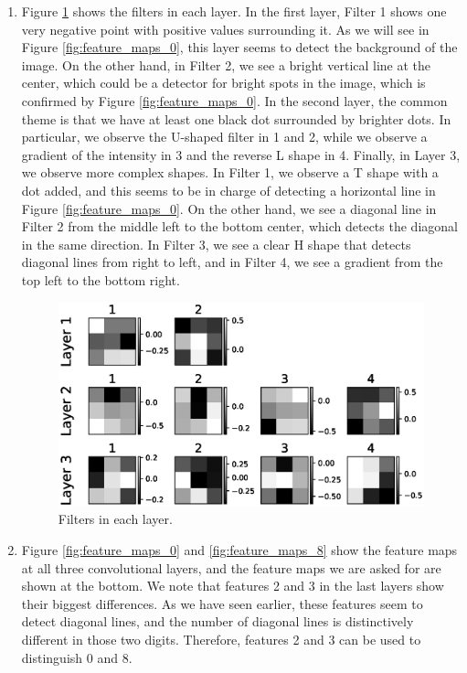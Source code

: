 \documentclass[
	12pt, %
]{../Template/fphw}
\begin{document}
\begin{enumerate}[label = (\arabic*)]
    \item Figure \ref{fig:filters} shows the filters in each layer. In the first layer, Filter 1 shows one very negative point with positive values surrounding it.   As we will see in Figure \ref{fig:feature_maps_0}, this layer seems to detect the background of the image. On the other hand, in Filter 2, we see a bright vertical line at the center, which could be a detector for bright spots in the image, which is confirmed by Figure \ref{fig:feature_maps_0}. In the second layer, the common theme is that we have at least one black dot surrounded by brighter dots. In particular, we observe the U-shaped filter in 1 and 2, while we observe a gradient of the intensity in 3 and the reverse L shape in 4. Finally, in Layer 3, we observe more complex shapes. In Filter 1, we observe a T shape with a dot added, and this seems to be in charge of detecting a horizontal line in Figure \ref{fig:feature_maps_0}. On the other hand, we see a diagonal line in Filter 2 from the middle left to the bottom center, which detects the diagonal in the same direction. In Filter 3, we see a clear H shape that detects diagonal lines from right to left, and in Filter 4, we see a gradient from the top left to the bottom right.
    \begin{figure}[!htbp]
        \centering 
        \includegraphics{codes/filters}
        \caption{Filters in each layer. }
        \label{fig:filters}
    \end{figure}
    \item Figure \ref{fig:feature_maps_0} and \ref{fig:feature_maps_8} show the feature maps at all three convolutional layers, and the feature maps we are asked for are shown at the bottom. We note that features 2 and 3 in the last layers show their biggest differences. As we have seen earlier, these features seem to detect diagonal lines, and the number of diagonal lines is distinctively different in those two digits. Therefore, features 2 and 3 can be used to distinguish 0 and 8.

\end{enumerate}
\end{document}
